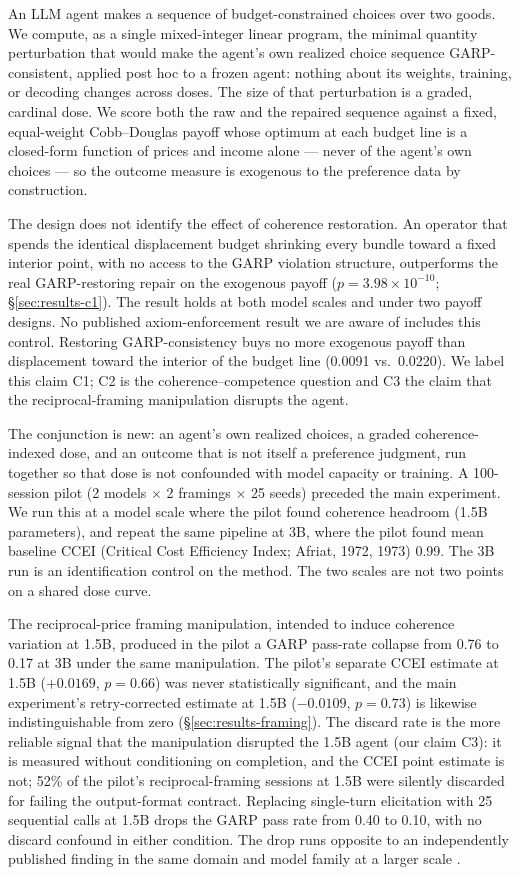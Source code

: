 \documentclass{article}
\begin{document}
An LLM agent makes a sequence of budget-constrained choices over two goods. We compute, as a
single mixed-integer linear program, the minimal quantity perturbation that would make the
agent's own realized choice sequence GARP-consistent, applied post hoc to a frozen agent: nothing
about its weights, training, or decoding changes across doses. The size of that perturbation is a
graded, cardinal dose. We score both the raw and the repaired sequence against a fixed,
equal-weight Cobb--Douglas payoff whose optimum at each budget line is a closed-form function of
prices and income alone --- never of the agent's own choices --- so the outcome measure is
exogenous to the preference data by construction.

The design does not identify the effect of coherence restoration. An operator that spends the
identical displacement budget shrinking every bundle toward a fixed interior point, with no access
to the GARP violation structure, outperforms the real GARP-restoring repair on the exogenous
payoff ($p=3.98\times10^{-10}$; \S\ref{sec:results-c1}). The result holds at both model scales and
under two payoff designs. No published axiom-enforcement result we are aware of
includes this control. Restoring GARP-consistency buys no more exogenous payoff than displacement
toward the interior of the budget line (0.0091 vs.\ 0.0220). We label this claim C1; C2 is the
coherence--competence question and C3 the claim that the reciprocal-framing manipulation disrupts
the agent.

The conjunction is new: an agent's own realized choices, a graded
coherence-indexed dose, and an outcome that is not itself a preference judgment, run together so
that dose is not confounded with model capacity or training. A 100-session pilot (2 models
$\times$ 2 framings $\times$ 25 seeds) preceded the main experiment. We run this at a model scale
where the pilot found coherence headroom (1.5B parameters), and repeat the same pipeline at 3B, where the
pilot found mean baseline CCEI (Critical Cost Efficiency Index; Afriat, 1972, 1973) 0.99. The 3B
run is an identification control on the method. The two
scales are not two points on a shared dose curve.

The reciprocal-price framing manipulation, intended to induce coherence variation at 1.5B,
produced in the pilot a GARP pass-rate collapse from 0.76 to 0.17 at 3B under the same
manipulation. The pilot's separate CCEI estimate at 1.5B ($+0.0169$, $p=0.66$) was never
statistically significant, and the main experiment's retry-corrected estimate at 1.5B
($-0.0109$, $p=0.73$) is likewise indistinguishable from zero (\S\ref{sec:results-framing}). The
discard rate is the more reliable signal that the manipulation disrupted the 1.5B agent (our
claim C3): it is measured without conditioning on completion, and the CCEI point estimate is
not; 52\% of the pilot's reciprocal-framing sessions at 1.5B were silently discarded for failing
the output-format contract. Replacing single-turn
elicitation with 25 sequential calls at 1.5B drops the GARP pass rate from 0.40 to 0.10, with no
discard confound in either condition. The drop runs opposite to an independently published
finding in the same domain and model family at a larger scale \citep{wang2025tactics}.
\end{document}
